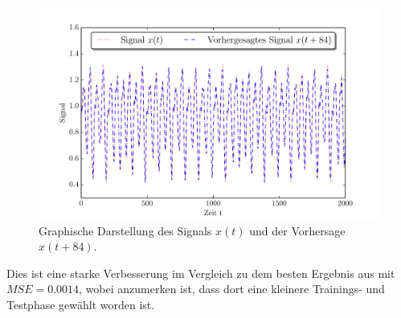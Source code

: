 \begin{figure}[H]
    \centering
    \includegraphics[width = 0.9 \textwidth]{figures/mackeyglass_pred.pdf}
    \caption{Graphische Darstellung des Signals $x(t)$ und der Vorhersage $x(t+84)$.}
    \label{fig:application_mackeyglass}
\end{figure}

Dies ist eine starke Verbesserung im Vergleich zu dem besten Ergebnis aus \citep{caraballo2014} mit $MSE = 0.0014$, wobei anzumerken ist, dass dort eine kleinere Trainings- und Testphase gewählt worden ist.